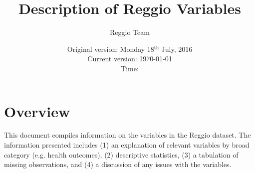 




\title{Description of Reggio Variables}
\author{Reggio Team}
\date{Original version: Monday 18$^{\text{th}}$ July, 2016 \\ Current version: \today \\ \vspace{1em} Time: \currenttime}
\maketitle

\tableofcontents

\doublespace

\section{Overview}
\label{sec:overview}
This document compiles information on the variables in the Reggio dataset. The information presented includes (1) an explanation of relevant variables by broad category (e.g. health outcomes), (2) descriptive statistics, (3) a tabulation of missing observations, and (4) a discussion of any issues with the variables. 









\singlespace


